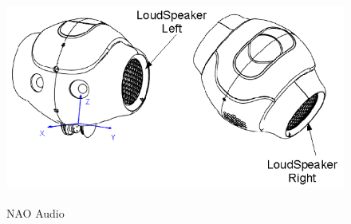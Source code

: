 \begin{figure}
	[h] \centering 
	\includegraphics[height=7cm]{figures/content/nao-audio.png} 
	\caption{NAO Audio}
	\label{fg:nao:audio} 
\end{figure}